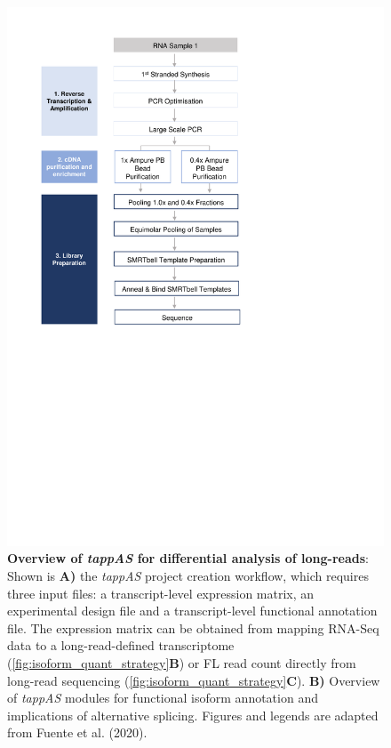 \begin{figure}[htp]
	\begin{center}
		\includegraphics[page=21,trim={0cm 5cm 0 0cm},clip, scale = 0.8]{Figures/ProjectDevelopment_Figures.pdf}
	\end{center}
	\captionsetup{width=0.95\textwidth,singlelinecheck=off}
	\caption[Overview of \textit{tappAS} for differential analysis of long-reads]%
	{\textbf{Overview of \textit{tappAS} for differential analysis of long-reads}: Shown is \textbf{A)} the \textit{tappAS} project creation workflow, which requires three input files: a transcript-level expression matrix, an experimental design file and a transcript-level functional annotation file. The expression matrix can be obtained from mapping RNA-Seq data to a long-read-defined transcriptome (\cref{fig:isoform_quant_strategy}\textbf{B}) or FL read count directly from long-read sequencing (\cref{fig:isoform_quant_strategy}\textbf{C}). \textbf{B)} Overview of \textit{tappAS} modules for functional isoform annotation and implications of alternative splicing. Figures and legends are adapted from Fuente et al. (2020)\cite{DeLaFuente2020}.
	}
	\label{fig:tappAS_overview}
\end{figure}

